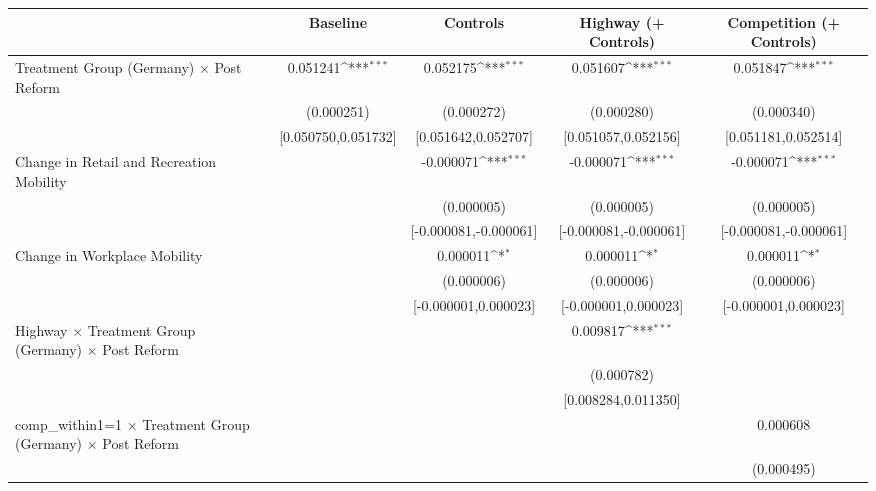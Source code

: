 {
\def\sym#1{\ifmmode^{#1}\else\(^{#1}\)\fi}
\begin{tabular}{l*{4}{c}}
\toprule
                    &\multicolumn{1}{c}{Baseline}&\multicolumn{1}{c}{Controls}&\multicolumn{1}{c}{Highway (+ Controls)}&\multicolumn{1}{c}{Competition (+ Controls)}\\
\midrule
Treatment Group (Germany) $\times$ Post Reform&    0.051241\sym{***}&    0.052175\sym{***}&    0.051607\sym{***}&    0.051847\sym{***}\\
                    &  (0.000251)         &  (0.000272)         &  (0.000280)         &  (0.000340)         \\
                    &[0.050750,0.051732]         &[0.051642,0.052707]         &[0.051057,0.052156]         &[0.051181,0.052514]         \\
Change in Retail and Recreation Mobility&                     &   -0.000071\sym{***}&   -0.000071\sym{***}&   -0.000071\sym{***}\\
                    &                     &  (0.000005)         &  (0.000005)         &  (0.000005)         \\
                    &                     &[-0.000081,-0.000061]         &[-0.000081,-0.000061]         &[-0.000081,-0.000061]         \\
Change in Workplace Mobility&                     &    0.000011\sym{*}  &    0.000011\sym{*}  &    0.000011\sym{*}  \\
                    &                     &  (0.000006)         &  (0.000006)         &  (0.000006)         \\
                    &                     &[-0.000001,0.000023]         &[-0.000001,0.000023]         &[-0.000001,0.000023]         \\
Highway $\times$ Treatment Group (Germany) $\times$ Post Reform&                     &                     &    0.009817\sym{***}&                     \\
                    &                     &                     &  (0.000782)         &                     \\
                    &                     &                     &[0.008284,0.011350]         &                     \\
comp\_within1=1 $\times$ Treatment Group (Germany) $\times$ Post Reform&                     &                     &                     &    0.000608         \\
                    &                     &                     &                     &  (0.000495)         \\

\end{tabular}}
